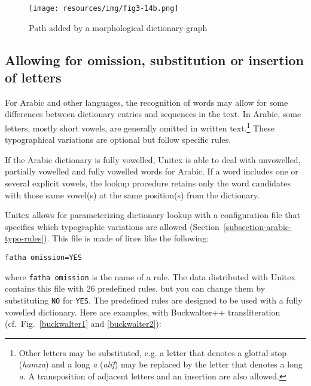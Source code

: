 \begin{figure}[!ht]
\begin{center}
\texttt{[image: resources/img/fig3-14b.png]}
\caption{Path added by a morphological dictionary-graph\label{morphoB}}
\end{center}
\end{figure}

\subsection{Allowing for omission, substitution or insertion of letters}
\label{section-vowel-restoration}
For Arabic and other languages, the recognition of words may allow for some differences between dictionary entries and sequences in the text. In Arabic, some letters, mostly short vowels, are generally omitted in written text.\footnote{ Other letters may be substituted, e.g. a letter that denotes a glottal stop (\textit{hamza}) and a long \textit{a}  (\textit{alif}) may be replaced by the letter that denotes a long \textit{a}. A transposition of adjacent letters and an insertion are also allowed.} These typographical variations are optional but follow specific rules.

\bigskip
\noindent If the Arabic dictionary is fully vowelled, Unitex is able to deal with unvowelled, partially vowelled and fully vowelled words for Arabic. If a word includes one or several explicit vowels, the lookup procedure retains only the word candidates with those same vowel(s) at the same position(s) from the dictionary.

\bigskip
\noindent Unitex allows for parameterizing dictionary lookup with a configuration file that specifies which typographic variations are allowed (Section~\ref{subsection-arabic-typo-rules}). This file is made of lines like the following:

\bigskip
\verb$fatha omission=YES$

\bigskip
\noindent where \verb$fatha omission$ is the name of a rule. The data distributed with Unitex contains this file with 26 predefined rules, but you can change them by substituting \verb$NO$ for \verb$YES$. The predefined rules are designed to be used with a fully vowelled dictionary. Here are examples, with Buckwalter++ transliteration (cf.~Fig.~\ref{buckwalter1} and \ref{buckwalter2}):

